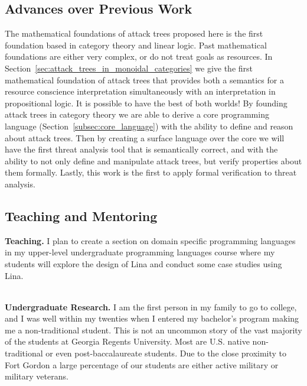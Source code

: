 \begin{full}
\subsection{Advances over Previous Work}
\label{subsec:advances_over_previous_work}
The mathematical foundations of attack trees proposed here is the
first foundation based in category theory and linear logic.  Past
mathematical foundations are either very complex, or do not treat
goals as resources.  In
Section~\ref{sec:attack_trees_in_monoidal_categories} we give the
first mathematical foundation of attack trees that provides both a
semantics for a resource conscience interpretation simultaneously with
an interpretation in propositional logic. It is possible to have the
best of both worlds!  By founding attack trees in category theory we
are able to derive a core programming language
(Section~\ref{subsec:core_language}) with the ability to define and
reason about attack trees.  Then by creating a surface language over
the core we will have the first threat analysis tool that is
semantically correct, and with the ability to not only define and
manipulate attack trees, but verify properties about them formally.
Lastly, this work is the first to apply formal verification to threat
analysis.

\subsection{Teaching and Mentoring}
\label{subsec:teaching_and_mentoring}

\textbf{Teaching.} I plan to create a section on domain specific
programming languages in my upper-level undergraduate programming
languages course where my students will explore the design of Lina and
conduct some case studies using Lina.

\ \\
\noindent
\textbf{Undergraduate Research.}  I am the first person in my family
to go to college, and I was well within my twenties when I entered my
bachelor's program making me a non-traditional student.  This is not
an uncommon story of the vast majority of the students at Georgia
Regents University.  Most are U.S. native non-traditional or even
post-baccalaureate students.  Due to the close proximity to Fort
Gordon a large percentage of our students are either active military
or military veterans.


\end{full}
